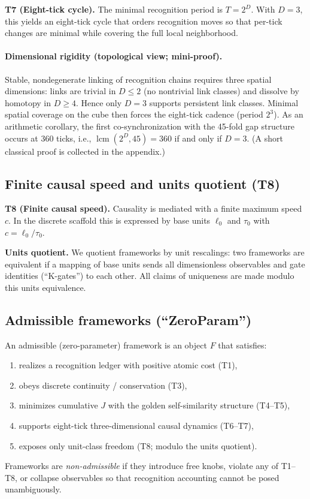 \documentclass[11pt]{article}
\begin{document}
\textbf{T7 (Eight\mbox{-}tick cycle).} The minimal recognition period is \(T=2^D\). With \(D=3\), this yields an eight\mbox{-}tick cycle that orders recognition moves so that per\mbox{-}tick changes are minimal while covering the full local neighborhood.

\paragraph{Dimensional rigidity (topological view; mini\mbox{-}proof).} Stable, nondegenerate linking of recognition chains requires three spatial dimensions: links are trivial in \(D\le 2\) (no nontrivial link classes) and dissolve by homotopy in \(D\ge 4\). Hence only \(D=3\) supports persistent link classes. Minimal spatial coverage on the cube then forces the eight\mbox{-}tick cadence (period \(2^3\)). As an arithmetic corollary, the first co\mbox{-}synchronization with the 45\mbox{-}fold gap structure occurs at 360 ticks, i.e., \(\operatorname{lcm}(2^D,45)=360\) if and only if \(D=3\). (A short classical proof is collected in the appendix.)

\subsection{Finite causal speed and units quotient (T8)}
\textbf{T8 (Finite causal speed).} Causality is mediated with a finite maximum speed \(c\). In the discrete scaffold this is expressed by base units \(\ell_0\) and \(\tau_0\) with \(c=\ell_0/\tau_0\).

\textbf{Units quotient.} We quotient frameworks by unit rescalings: two frameworks are equivalent if a mapping of base units sends all dimensionless observables and gate identities (``K\mbox{-}gates'') to each other. All claims of uniqueness are made modulo this units equivalence.

\subsection{Admissible frameworks (``ZeroParam'')}
An admissible (zero\mbox{-}parameter) framework is an object \(F\) that satisfies:
\begin{enumerate}
  \item realizes a recognition ledger with positive atomic cost (T1),
  \item obeys discrete continuity / conservation (T3),
  \item minimizes cumulative \(J\) with the golden self\mbox{-}similarity structure (T4--T5),
  \item supports eight\mbox{-}tick three\mbox{-}dimensional causal dynamics (T6--T7),
  \item exposes only unit\mbox{-}class freedom (T8; modulo the units quotient).
\end{enumerate}
Frameworks are \emph{non\mbox{-}admissible} if they introduce free knobs, violate any of T1--T8, or collapse observables so that recognition accounting cannot be posed unambiguously.
\end{document}
